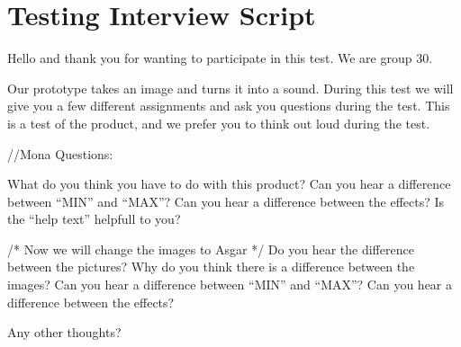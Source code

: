 \chapter{Testing Interview Script}\label{ch:appAinterviewscript}
Hello and thank you for wanting to participate in this test. We are group 30.

Our prototype takes an image and turns it into a sound. During this test we will give you a few different assignments and ask you questions during the test. This is a test of the product, and we prefer you to think out loud during the test.

//Mona
Questions: 

What do you think you have to do with this product?
Can you hear a difference between “MIN” and “MAX”?
Can you hear a difference between the effects?
Is the “help text” helpfull to you?

/* Now we will change the images to Asgar */
Do you hear the difference between the pictures?
Why do you think there is a difference between the images?
Can you hear a difference between “MIN” and “MAX”?
Can you hear a difference between the effects?

Any other thoughts?
